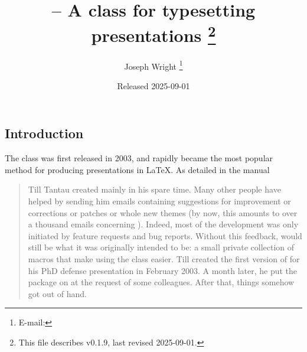 \documentclass{l3doc}
\makeatletter
\let\acro\@firstofone
\def\filedate{2025-09-01}
\def\fileversion{v0.1.9}
\makeatother
\begin{document}
\title{%
   -- A class for typesetting presentations%
  \thanks{This file describes \fileversion,
    last revised \filedate.}%
}

\author{%
  Joseph Wright%
  \thanks{%
    E-mail: %
  }%
}

\date{Released \filedate}

\maketitle

\tableofcontents

\begin{documentation}

\section{Introduction%
  \label{sec:intro}}

The  class was first released in 2003, and rapidly became the
most popular method for producing presentations in \LaTeX{}. As detailed in
the  manual
\begin{quotation}
  Till Tantau created  mainly in his spare time. Many other people
  have helped by sending him emails containing suggestions for improvement or
  corrections or patches or whole new themes (by now, this amounts to over a
  thousand emails concerning ). Indeed, most of the development was
  only initiated by feature requests and bug reports. Without this feedback,
   would still be what it was originally intended to be: a small
  private collection of macros that make using the  class easier.
  Till created the first version of  for his PhD defense
  presentation in February 2003. A month later, he put the package on
  \acro{ctan} at the request of some colleagues. After that, things somehow got
  out of hand.
\end{quotation}


\end{documentation}
\end{document}
